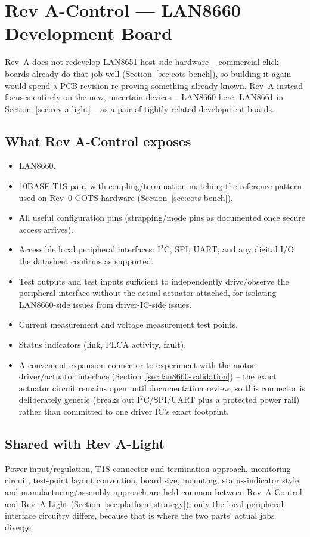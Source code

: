\section{Rev A-Control --- LAN8660 Development Board}
\label{sec:rev-a-control}

Rev~A does not redevelop LAN8651 host-side hardware -- commercial click boards already do that job well (Section~\ref{sec:cots-bench}), so building it again would spend a PCB revision re-proving something already known. Rev~A instead focuses entirely on the new, uncertain devices -- LAN8660 here, LAN8661 in Section~\ref{sec:rev-a-light} -- as a pair of tightly related development boards.

\subsection{What Rev A-Control exposes}

\begin{itemize}[itemsep=0.1em]
\item LAN8660.
\item 10BASE-T1S pair, with coupling/termination matching the reference pattern used on Rev~0 COTS hardware (Section~\ref{sec:cots-bench}).
\item All useful configuration pins (strapping/mode pins as documented once secure access arrives).
\item Accessible local peripheral interfaces: I$^2$C, SPI, UART, and any digital I/O the datasheet confirms as supported.
\item Test outputs and test inputs sufficient to independently drive/observe the peripheral interface without the actual actuator attached, for isolating LAN8660-side issues from driver-IC-side issues.
\item Current measurement and voltage measurement test points.
\item Status indicators (link, PLCA activity, fault).
\item A convenient expansion connector to experiment with the motor-driver/actuator interface (Section~\ref{sec:lan8660-validation}) -- the exact actuator circuit remains open until documentation review, so this connector is deliberately generic (breaks out I$^2$C/SPI/UART plus a protected power rail) rather than committed to one driver IC's exact footprint.
\end{itemize}

\subsection{Shared with Rev A-Light}

Power input/regulation, T1S connector and termination approach, monitoring circuit, test-point layout convention, board size, mounting, status-indicator style, and manufacturing/assembly approach are held common between Rev~A-Control and Rev~A-Light (Section~\ref{sec:platform-strategy}); only the local peripheral-interface circuitry differs, because that is where the two parts' actual jobs diverge.
